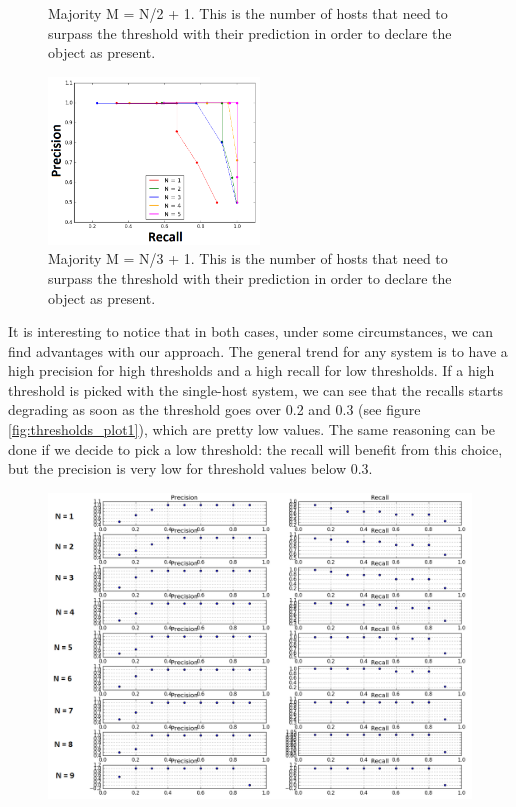 \documentclass[10pt,conference,compsocconf]{IEEEtran}
\begin{document}
\begin{enumerate}
\begin{figure}
	\caption {Majority M = N/2 + 1. This is the number of hosts that need to surpass the threshold with their prediction in order to declare the object as present.}
	\label{fig:person_FP_FN_summary_majority2}
\end{figure}
\begin{figure}
	\captionsetup{type=figure}
	\includegraphics[width=0.5\textwidth]{img/summary_majority_THIRD_N1_5_CONNECTED.png}
	\caption {Majority M = N/3 + 1. This is the number of hosts that need to surpass the threshold with their prediction in order to declare the object as present.}
	\label{fig:person_FP_FN_summary_majority3}
\end{figure}
It is interesting to notice that in both cases, under some circumstances, we can find advantages with our approach. The general trend for any system is to have a high precision for high thresholds and a high recall for low thresholds. If a high threshold is picked with the single-host system, we can see that the recalls starts degrading as soon as the threshold goes over 0.2 and 0.3 (see figure \ref{fig:thresholds_plot1}), which are pretty low values. The same reasoning can be done if we decide to pick a low threshold: the recall will benefit from this choice, but the precision is very low for threshold values below 0.3.
\begin{figure}
	\includegraphics[width=\textwidth]{img/summary_majority_THIRD_BIG_small.png}

\end{figure}
\end{enumerate}
\end{document}
